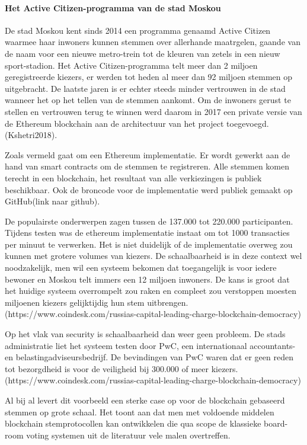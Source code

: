 				\paragraph{Het Active Citizen-programma van de stad Moskou}
				De stad Moskou kent sinds 2014 een programma genaamd Active Citizen waarmee haar inwoners  kunnen stemmen over allerhande maatrgelen, gaande van de naam voor een nieuwe metro-trein tot de kleuren van zetels in een nieuw sport-stadion. Het Active Citizen-programma telt meer dan 2 miljoen geregistreerde kiezers, er werden tot heden al meer dan 92 miljoen stemmen op uitgebracht. De laatste jaren is er echter steeds minder vertrouwen in de stad wanneer het op het tellen van de stemmen aankomt. Om de inwoners gerust te stellen en vertrouwen terug te winnen werd  daarom in 2017 een private versie van de Ethereum blockchain aan de architectuur van het project toegevoegd. (Kshetri2018).
				
				Zoals vermeld gaat om een Ethereum implementatie. Er wordt gewerkt aan de hand van smart contracts om de stemmen te registreren. Alle stemmen komen terecht in een  blockchain, het resultaat van alle verkiezingen is publiek beschikbaar. Ook de  broncode voor de implementatie werd publiek gemaakt op GitHub(link naar github).
				
				De populairste onderwerpen zagen tussen de 137.000 tot 220.000 participanten. Tijdens testen was de  ethereum implementatie  instaat om tot 1000 transacties per minuut te verwerken. Het is niet duidelijk of de implementatie overweg zou kunnen met  grotere volumes van kiezers. De schaalbaarheid is in deze context wel noodzakelijk, men wil een systeem bekomen dat toegangelijk is voor iedere bewoner en Moskou telt immers een 12 miljoen inwoners. De kans is groot dat het huidige systeem overrompelt zou raken en compleet zou verstoppen moesten miljoenen kiezers gelijktijdig hun stem uitbrengen.(https://www.coindesk.com/russias-capital-leading-charge-blockchain-democracy)
				
				Op het vlak van security is schaalbaarheid dan weer geen probleem. De stads administratie liet het systeem testen door PwC, een internationaal accountants- en belastingadviseursbedrijf. De bevindingen van PwC waren dat er geen reden tot bezorgdheid is voor de veiligheid bij  300.000 of meer kiezers. (https://www.coindesk.com/russias-capital-leading-charge-blockchain-democracy)
				
				Al bij al levert dit voorbeeld een sterke case op voor de blockchain gebaseerd stemmen op grote schaal. Het toont aan dat men met voldoende middelen blockchain stemprotocollen kan ontwikkelen die qua scope de klassieke board-room voting systemen uit de literatuur vele malen overtreffen. 
